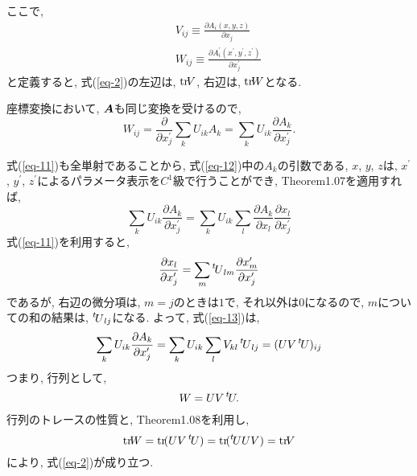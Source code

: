 \documentclass{jsarticle}
\newcommand*{\mbold}[1]{\mbox{\boldmath $#1$}}
\newcommand*{\transp}[1]{\prescript{t\!}{}{#1}}
\newcommand*{\trace}[1]{{\rm tr}\!{#1}}
\begin{document}
ここで, 
\begin{subequations}
  \begin{eqnarray}
    && V_{ij} \equiv \frac{\partial A_i(x, y, z)}{\partial x_j} \\
    && W_{ij} \equiv \frac{\partial A^\prime_i(x^\prime, y^\prime, z^\prime)}{\partial x^\prime_j}
  \end{eqnarray}
\end{subequations}
と定義すると, 
式(\ref{eq-2})の左辺は, $\trace{V}$, 右辺は, $\trace{W}$となる. 

座標変換において, $\mbold{A}$も同じ変換を受けるので, 
\begin{equation}\label{eq-12}
  W_{ij} = \frac{\partial}{\partial x^\prime_j}\sum_k U_{ik}A_k
  = \sum_k U_{ik}\frac{\partial A_k}{\partial x^\prime_j}.
\end{equation}

式(\ref{eq-11})も全単射であることから, 式(\ref{eq-12})中の$A_k$の引数である, $x$, $y$, $z$は, $x^\prime$, $y^\prime$, $z^\prime$によるパラメータ表示を$C^1$級で行うことができ, 
Theorem1.07を適用すれば, 
\begin{equation}\label{eq-13}
  \sum_k U_{ik}\frac{\partial A_k}{\partial x^\prime_j}
  = \sum_k U_{ik} \sum_l \frac{\partial A_k}{\partial x_l}\frac{\partial x_l}{\partial x^\prime_j}
\end{equation} 
式(\ref{eq-11})を利用すると, 
\begin{equation}
  \frac{\partial x_l}{\partial x^\prime_j} = \sum_m \transp{U}_{lm}\frac{\partial x^\prime_m}{\partial x^\prime_j}
\end{equation}
であるが, 右辺の微分項は, $m = j$のときは$1$で, それ以外は$0$になるので, $m$についての和の結果は, $\transp{U}_{lj}$になる. 
よって, 式(\ref{eq-13})は, 
\begin{equation}
  \sum_k U_{ik} \frac{\partial A_k}{\partial x^\prime_j} 
  = \sum_k U_{ik} \sum_l V_{kl} \transp{U}_{lj}
  = (U V \transp{U})_{ij}
\end{equation}
つまり, 行列として, 
\begin{equation}
  W = UV\transp{U}.
\end{equation}
行列のトレースの性質と, Theorem1.08を利用し, 
\begin{equation}
  \trace{W} = \trace{(UV\transp{U})} = \trace{(\transp{U} UV)} = \trace{V}
\end{equation}
により, 式(\ref{eq-2})が成り立つ. 
\end{document}

